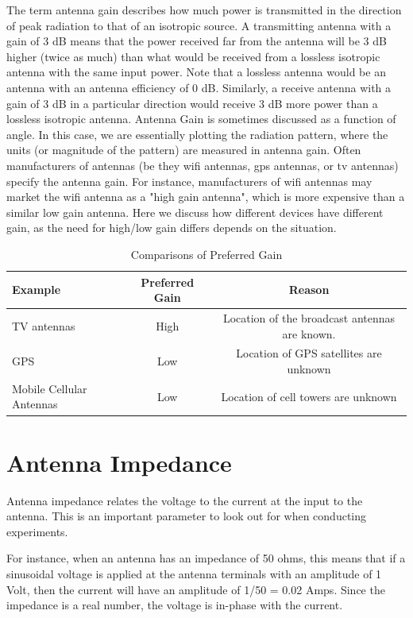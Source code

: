 \documentclass[a4paper,12pt]{report}
\begin{document}
The term antenna gain describes how much power is transmitted
in the direction of peak radiation to that of an isotropic source.
A transmitting antenna with a gain of 3 dB means that the power received
far from the antenna will be 3 dB higher (twice as much) than
what would be received from a lossless isotropic antenna with the
same input power. Note that a lossless antenna would be an antenna
with an antenna efficiency of 0 dB.
Similarly, a receive antenna with a gain of 3 dB in a particular direction
would receive 3 dB more power than a lossless isotropic antenna.
Antenna Gain is sometimes discussed as a function of angle.
In this case, we are essentially plotting the radiation pattern,
where the units (or magnitude of the pattern) are measured in antenna gain.
Often manufacturers of antennas
(be they wifi antennas, gps antennas, or tv antennas) specify the antenna gain.
For instance, manufacturers of wifi antennas may market the wifi antenna as a "high gain antenna",
which is more expensive than a similar low gain antenna.
Here we discuss how different devices have different gain,
as the need for high/low gain differs depends on the situation.

\begin{table}[h]
  \centering
  \caption{Comparisons of Preferred Gain}
  \label{table}
  \begin{tabular}[]{lcc}
    \hline
    Example & Preferred Gain & Reason \\
    \hline\hline
    TV antennas & High & Location of the broadcast antennas are known. \\
    \hline
    GPS & Low & Location of GPS satellites are unknown \\
    \hline
    Mobile Cellular Antennas & Low & Location of cell towers are unknown \\
    \hline
  \end{tabular}
\end{table}

\section{Antenna Impedance}


Antenna impedance relates the voltage to the current at the input to the antenna.
This is an important parameter to look out for when conducting experiments.

For instance, when an antenna has an impedance of 50 ohms,
this means that if a sinusoidal voltage is applied at the antenna terminals with an amplitude of 1 Volt,
then the current will have an amplitude of 1/50 = 0.02 Amps.
Since the impedance is a real number, the voltage is in-phase with the current.
\end{document}
